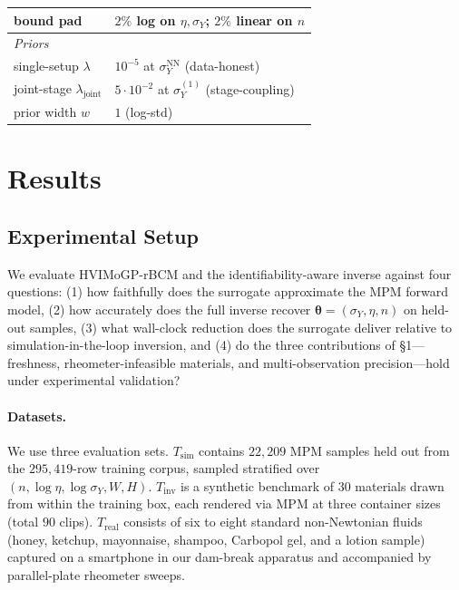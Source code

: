\begin{table}[!htbp]
\begin{tabular}{@{}ll@{}}
\quad bound pad                     & $2\%$ log on $\eta,\sigma_{Y}$;
                                      $2\%$ linear on $n$ \\
\midrule
\textit{Priors} & \\
\quad single-setup $\lambda$        & $10^{-5}$ at $\sigma_{Y}^{\mathrm{NN}}$
                                      (data-honest) \\
\quad joint-stage $\lambda_{\mathrm{joint}}$ & $5\cdot 10^{-2}$ at
                                               $\sigma_{Y}^{(1)}$
                                               (stage-coupling) \\
\quad prior width $w$               & $1$ (log-std) \\
\bottomrule
\end{tabular}
\end{table}


\section{Results}
\label{sec:results}

\subsection{Experimental Setup}

We evaluate HVIMoGP-rBCM and the identifiability-aware inverse
against four questions: (1) how faithfully does the surrogate
approximate the MPM forward model, (2) how accurately does the full
inverse recover $\boldsymbol{\theta} = (\sigma_Y, \eta, n)$ on
held-out samples, (3) what wall-clock reduction does the surrogate
deliver relative to simulation-in-the-loop inversion, and (4) do the
three contributions of \S1---freshness, rheometer-infeasible
materials, and multi-observation precision---hold under experimental
validation?

\paragraph{Datasets.}
We use three evaluation sets. \emph{$T_{\mathrm{sim}}$} contains
$22{,}209$ MPM samples held out from the $295{,}419$-row training
corpus, sampled stratified over
$(n, \log\eta, \log\sigma_Y, W, H)$. \emph{$T_{\mathrm{inv}}$} is a
synthetic benchmark of $30$ materials drawn from within the training
box, each rendered via MPM at three container sizes (total $90$
clips). \emph{$T_{\mathrm{real}}$} consists of six to eight standard
non-Newtonian fluids (honey, ketchup, mayonnaise, shampoo, Carbopol
gel, and a lotion sample) captured on a smartphone in our dam-break
apparatus and accompanied by parallel-plate rheometer sweeps.


